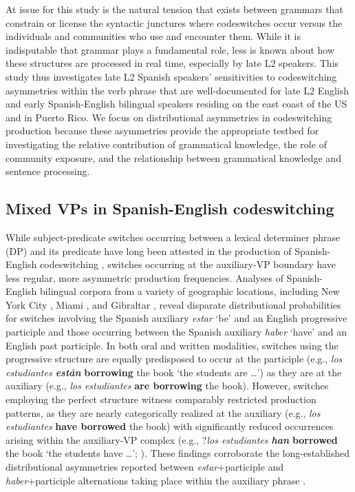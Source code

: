 \documentclass[output=paper,colorlinks,citecolor=brown]{langscibook}
\begin{document}
At issue for this study is the natural tension that exists between grammars that constrain or license the syntactic junctures where codeswitches occur versus the individuals and communities who use and encounter them. While it is indisputable that grammar plays a fundamental role, less is known about how these structures are processed in real time, especially by late L2 speakers. This study thus investigates late L2 Spanish speakers’ sensitivities to codeswitching asymmetries within the verb phrase that are well-documented for late L2 English and early Spanish-English bilingual speakers residing on the east coast of the US and in Puerto Rico. We focus on distributional asymmetries in codeswitching production because these asymmetries provide the appropriate testbed for investigating the relative contribution of grammatical knowledge, the role of community exposure, and the relationship between grammatical knowledge and sentence processing.

\subsection{Mixed VPs in Spanish-English codeswitching}
While subject-predicate switches occurring between a lexical determiner phrase (DP) and its predicate have long been attested in the production of Spanish-English codeswitching \citep{Poplack1980}, switches occurring at the auxiliary-VP boundary have less regular, more asymmetric production frequencies. Analyses of Spanish-English bilingual corpora from a variety of geographic locations, including New York City \citep{Poplack1980}, Miami \citep{Deucharetal2014}, and Gibraltar \citep{GuzzardoTamargoetal2016}, reveal disparate distributional probabilities for switches involving the Spanish auxiliary \textit{estar} ‘be’ and an English progressive participle and those occurring between the Spanish auxiliary \textit{haber} ‘have’ and an English past participle. In both oral and written modalities, switches using the progressive structure are equally predisposed to occur at the participle (e.g., \textit{los estudiantes \textbf{est\'an}} \textbf{borrowing} the book `the students are \ldots') as they are at the auxiliary (e.g., \textit{los estudiantes} \textbf{are borrowing} the book). However, switches employing the perfect structure witness comparably restricted production patterns, as they are nearly categorically realized at the auxiliary (e.g., \textit{los estudiantes} \textbf{have borrowed} the book) with significantly reduced occurrences arising within the auxiliary-VP complex (e.g., ?\textit{los estudiantes \textbf{han}} \textbf{borrowed} the book `the students have \ldots'; \cite{GuzzardoTamargoetal2016}). These findings corroborate the long-established distributional asymmetries reported between \textit{estar}+participle and \textit{haber}+participle alternations taking place within the auxiliary phrase \citep{Lipski1978,Lipski1985,Pfaff1979,Poplack1980}.
\end{document}
